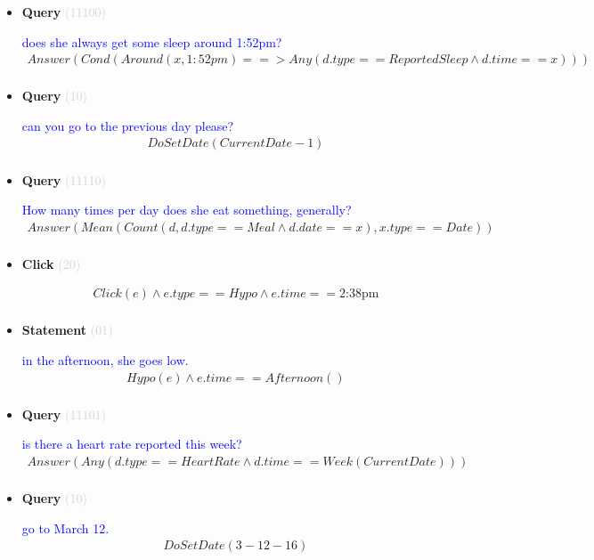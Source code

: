 \documentclass[11pt]{article}
\newcommand{\key}[1]{\textcolor{lightgray}{#1}}
\newcounter{CQuery}
\newcounter{CStatement}
\newcounter{CClick}
\begin{document}
\begin{itemize}
\item
\textbf{Query\theCQuery} \key{(11100)} \addtocounter{CQuery}{1}
\textcolor{blue}{ does she always get some sleep around 1:52pm? }
\begin{multline*}
Answer(Cond(Around(x, 1:52pm) ==> Any(d.type==ReportedSleep \wedge d.time==x))) \\ 
\end{multline*}


\item
\textbf{Query\theCQuery} \key{(10)} \addtocounter{CQuery}{1}
\textcolor{blue}{ can you go to the previous day please? }
\begin{multline*}
DoSetDate(CurrentDate - 1) \\ 
\end{multline*}


\item
\textbf{Query\theCQuery} \key{(11110)} \addtocounter{CQuery}{1}
\textcolor{blue}{ How many times per day does she eat something, generally? }
\begin{multline*}
Answer(Mean(Count(d, d.type==Meal \wedge d.date==x), x.type==Date)) \\ 
\end{multline*}


\item
\textbf{Click\theCClick} \key{(20)} \addtocounter{CClick}{1}
\textcolor{blue}{  }
\begin{multline*}
Click(e) \wedge e.type==Hypo \wedge e.time==\mbox{2:38pm} \\ 
\end{multline*}


\item
\textbf{Statement\theCStatement} \key{(01)} \addtocounter{CStatement}{1}
\textcolor{blue}{ in the afternoon, she goes low. }
\begin{multline*}
Hypo(e) \wedge e.time==Afternoon() \\ 
\end{multline*}


\item
\textbf{Query\theCQuery} \key{(11101)} \addtocounter{CQuery}{1}
\textcolor{blue}{ is there a heart rate reported this week? }
\begin{multline*}
Answer(Any(d.type==HeartRate \wedge d.time==Week(CurrentDate))) \\ 
\end{multline*}


\item
\textbf{Query\theCQuery} \key{(10)} \addtocounter{CQuery}{1}
\textcolor{blue}{ go to March 12. }
\begin{multline*}
DoSetDate(3-12-16) \\ 
\end{multline*}



\end{itemize}
\end{document}

